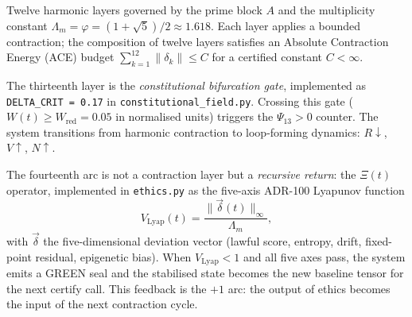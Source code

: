 \documentclass[12pt,a4paper]{article}
\theoremstyle{plain}
\theoremstyle{definition}
\newcommand{\Lambdam}{\Lambda_m}
\renewcommand{\Psi}{\varPsi}
\begin{document}
\begin{description}[leftmargin=2em, style=nextline]
  \item[Layers 1--12 (Harmonic Contraction)]
    Twelve harmonic layers governed by the prime block $A$ and the multiplicity
    constant $\Lambdam = \varphi = (1+\sqrt{5})/2 \approx 1.618$.  Each layer applies
    a bounded contraction; the composition of twelve layers satisfies an
    Absolute Contraction Energy (ACE) budget $\sum_{k=1}^{12} \|\delta_k\| \leq C$
    for a certified constant $C < \infty$.

  \item[Layer 13 (Bifurcation Gate)]
    The thirteenth layer is the \emph{constitutional bifurcation gate}, implemented
    as \texttt{DELTA\_CRIT = 0.17} in \texttt{constitutional\_field.py}.  Crossing this
    gate ($W(t) \geq W_{\mathrm{red}} = 0.05$ in normalised units) triggers the
    $\Psi_{13} > 0$ counter.  The system transitions from harmonic contraction to
    loop-forming dynamics: $R\downarrow$, $V\uparrow$, $N\uparrow$.

  \item[Layer 14 / The +1 Arc (Ethical Recursion)]
    The fourteenth arc is not a contraction layer but a \emph{recursive return}:
    the $\Xi(t)$ operator, implemented in \texttt{ethics.py} as the five-axis
    ADR-100 Lyapunov function
    \begin{equation}
      V_{\mathrm{Lyap}}(t) = \frac{\|\vec{\delta}(t)\|_\infty}{\Lambdam},
      \label{eq:lyapunov}
    \end{equation}
    with $\vec{\delta}$ the five-dimensional deviation vector (lawful score, entropy,
    drift, fixed-point residual, epigenetic bias).  When $V_{\mathrm{Lyap}} < 1$ and
    all five axes pass, the system emits a \textcolor{wardgreen}{GREEN} seal and the
    stabilised state becomes the new baseline tensor for the next certify call.
    This feedback is the $+1$ arc: the output of ethics becomes the input of the
    next contraction cycle.
\end{description}
\end{document}
